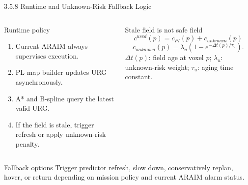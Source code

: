 \documentclass[10pt,aspectratio=169,xcolor=dvipsnames]{beamer}
\begin{document}
\begin{frame}{3.5.8 Runtime and Unknown-Risk Fallback Logic}

  \small
  \begin{columns}[T]
    \begin{block}{Runtime policy}
      \footnotesize
      \begin{enumerate}
        \item Current ARAIM always supervises execution.
        \item PL map builder updates URG asynchronously.
        \item A* and B-spline query the latest valid URG.
        \item If the field is stale, trigger refresh or apply unknown-risk penalty.
      \end{enumerate}
    \end{block}
    \begin{alertblock}{Stale field is not safe field}
      \footnotesize
      \[
        c^{used}(p)=c_{PI}(p)+c_{unknown}(p)
      \]
      \[
        c_{unknown}(p)=\lambda_u\left(1-e^{-\Delta t(p)/\tau_u}\right).
      \]
      \scriptsize
      $\Delta t(p)$: field age at voxel $p$; $\lambda_u$: unknown-risk weight; $\tau_u$: aging time constant.
    \end{alertblock}
  \end{columns}
  \begin{exampleblock}{Fallback options}
    \footnotesize
    Trigger predictor refresh, slow down, conservatively replan, hover, or return depending on mission policy and current ARAIM alarm status.
  \end{exampleblock}

\end{frame}
\end{document}
